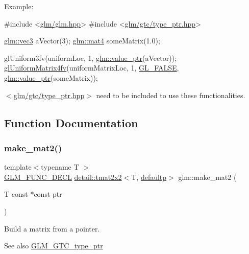 Example\+: 
\begin{DoxyCode}
\textcolor{preprocessor}{#include <\hyperlink{third-party_2include_2glm_2glm_8hpp}{glm/glm.hpp}>}
\textcolor{preprocessor}{#include <\hyperlink{type__ptr_8hpp}{glm/gtc/type\_ptr.hpp}>}

\hyperlink{structglm_1_1detail_1_1tvec3}{glm::vec3} aVector(3);
\hyperlink{structglm_1_1detail_1_1tmat4x4}{glm::mat4} someMatrix(1.0);

glUniform3fv(uniformLoc, 1, \hyperlink{group__gtc__type__ptr_gaf019636bb8bd7c9efb7c7ce3bb23bcfc}{glm::value\_ptr}(aVector));
\hyperlink{dummy_8cpp_a0294e2a1faa1a1ff720a35ac06b4282a}{glUniformMatrix4fv}(uniformMatrixLoc, 1, \hyperlink{dummy_8cpp_abca6d43f43fae31f49dcb883b2f301f6}{GL\_FALSE}, 
      \hyperlink{group__gtc__type__ptr_gaf019636bb8bd7c9efb7c7ce3bb23bcfc}{glm::value\_ptr}(someMatrix));
\end{DoxyCode}


$<$\hyperlink{type__ptr_8hpp}{glm/gtc/type\+\_\+ptr.\+hpp}$>$ need to be included to use these functionalities. 

\subsection{Function Documentation}
\mbox{\label{group__gtc__type__ptr_ga903422b2c346cbaccad3153a5a1f404c}} 
\subsubsection{\texorpdfstring{make\+\_\+mat2()}{make\_mat2()}}
{\footnotesize\ttfamily template$<$typename T $>$ \\
\hyperlink{setup_8hpp_ab2d052de21a70539923e9bcbf6e83a51}{G\+L\+M\+\_\+\+F\+U\+N\+C\+\_\+\+D\+E\+CL} \hyperlink{structglm_1_1detail_1_1tmat2x2}{detail\+::tmat2x2}$<$T, \hyperlink{namespaceglm_a0f04f086094c747d227af4425893f545a9d21ccd8b5a009ec7eb7677befc3bf51}{defaultp}$>$ glm\+::make\+\_\+mat2 (\begin{DoxyParamCaption}\item[{T const $\ast$const}]{ptr }\end{DoxyParamCaption})}

Build a matrix from a pointer. \begin{DoxySeeAlso}{See also}
\hyperlink{group__gtc__type__ptr}{G\+L\+M\+\_\+\+G\+T\+C\+\_\+type\+\_\+ptr} 
\end{DoxySeeAlso}


